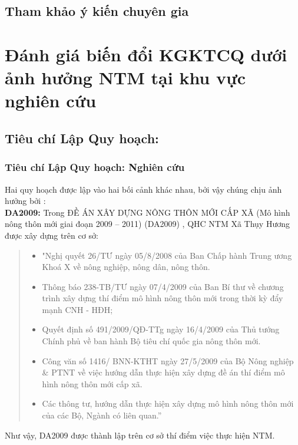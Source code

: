 \documentclass[../thesis.tex]{subfiles}
\begin{document}
\subsection {Tham khảo ý kiến chuyên gia}
\section {Đánh giá biến đổi KGKTCQ dưới ảnh hưởng NTM tại khu vực nghiên cứu}
\subsection {Tiêu chí Lập Quy hoạch:}
\subsubsection {Tiêu chí Lập Quy hoạch: Nghiên cứu}
Hai quy hoạch được lập vào hai bối cảnh khác nhau, bởi vậy chúng chịu ảnh hưởng bởi :\\
\textbf{DA2009:} Trong ĐỀ ÁN XÂY DỰNG NÔNG THÔN MỚI CẤP XÃ (Mô hình nông thôn mới giai đoạn 2009 – 2011) (DA2009) \cite{da2009}, QHC NTM Xã Thụy Hương được xây dựng trên cơ sở:

 \begin{quote}
 \begin{itemize}
\item "Nghị quyết 26/TƯ ngày 05/8/2008 của Ban Chấp hành Trung ương Khoá X về nông nghiệp, nông dân, nông thôn.
\item Thông báo 238-TB/TƯ ngày 07/4/2009 của Ban Bí thư về chương trình xây dựng thí điểm mô hình nông thôn mới trong thời kỳ đẩy mạnh CNH - HĐH;
\item Quyết định số 491/2009/QĐ-TTg ngày 16/4/2009 của Thủ tướng Chính phủ về ban hành Bộ tiêu chí quốc gia nông thôn mới.
\item Công văn số 1416/ BNN-KTHT ngày 27/5/2009 của Bộ Nông nghiệp \& PTNT về việc hướng dẫn thực hiện xây dựng đề án thí điểm mô hình nông thôn mới cấp xã.
\item Các thông tư, hướng dẫn thực hiện xây dựng mô hình nông thôn mới của các Bộ, Ngành có liên quan.”
\end{itemize}
 \end{quote}

Như vậy, DA2009 được thành lập trên cơ sở thí điểm việc thực hiện NTM.
\end{document}
